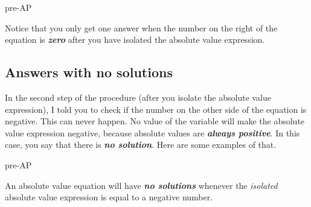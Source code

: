 
\begin{taggedblock}{pre-AP}
\end{taggedblock}

\begin{center}
    \begin{tcolorbox}[width=4in]
        Notice that you only get one answer when the number on the right 
        of the equation is {\bfseries\itshape zero}
        after you have isolated the absolute value expression.
    \end{tcolorbox}
\end{center}







\subsection*{Answers with no solutions}

In the second step of the procedure
(after you isolate the absolute value expression),
I told you to check if the number on the other side of the equation is negative.
This can never happen.
No value of the variable will make the absolute value expression negative,
because absolute values are {\bfseries\itshape always positive}. 
In this case, you say that there is {\bfseries\itshape no solution}. 
Here are some examples of that.





\begin{taggedblock}{pre-AP}
\end{taggedblock}

\begin{center}
    \begin{tcolorbox}[width=4in]
        An absolute value equation will have {\bfseries\itshape no solutions}
        whenever the \emph{isolated} absolute value expression
        is equal to a negative number.
    \end{tcolorbox}
\end{center}


